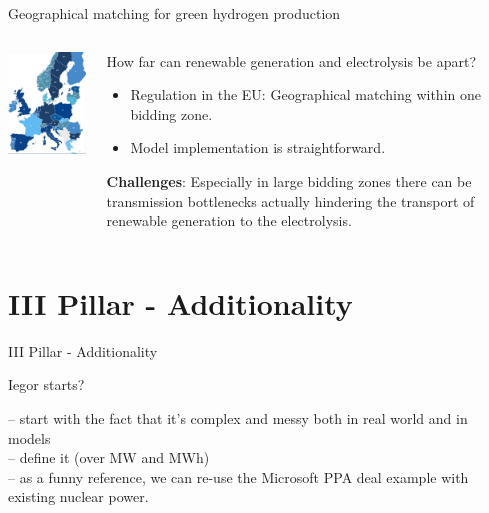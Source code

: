 \begin{frame}{Geographical matching for green hydrogen production}
\begin{columns}
	\begin{column}{0.4\textwidth}
		\includegraphics[width=5cm, clip, trim={0 0.1cm 0 0}]{images/biding_zones_eu.png}
	\end{column}
	\begin{column}{0.6\textwidth}
		How far can renewable generation and electrolysis be apart? 
		\begin{itemize}
			\item 	Regulation in the EU: Geographical matching within one \alert{bidding zone}.
			\item 	Model implementation is straightforward. 
		\end{itemize}

	\vspace{0.5 cm}
		\textbf{Challenges}: Especially in large bidding zones there can be \alert{transmission bottlenecks} actually hindering the transport of renewable generation to the electrolysis. 
	\end{column}
\end{columns}
\end{frame}

\section{III Pillar - Additionality}
\begin{frame}{III Pillar - Additionality}

  Iegor starts? 

  -- start with the fact that it's complex and messy both in real world and in models\\
  -- define it (over MW and MWh)\\
  -- as a funny reference, we can re-use the Microsoft PPA deal example with existing nuclear power.

\end{frame}


